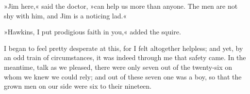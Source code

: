»Jim here,« said the doctor, »can help us more than anyone. The men are not shy with him, and Jim is a noticing lad.«

»Hawkins, I put prodigious faith in you,« added the squire.

I began to feel pretty desperate at this, for I felt altogether helpless; and yet, by an odd train of circumstances, it was indeed through me that safety came. In the meantime, talk as we pleased, there were only seven out of the twenty-six on whom we knew we could rely; and out of these seven one was a boy, so that the grown men on our side were six to their nineteen.
